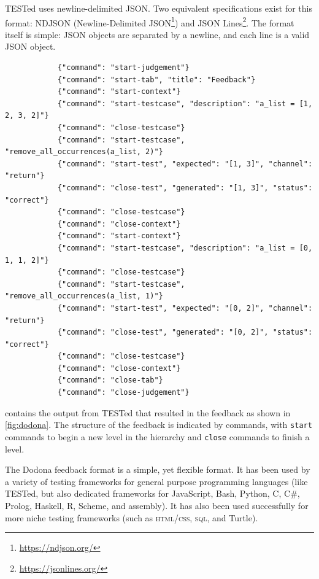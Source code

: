 \documentclass[../main]{subfiles}
\begin{document}
TESTed uses newline-delimited JSON\@.
Two equivalent specifications exist for this format: NDJSON (Newline-Delimited JSON\footnote{\url{https://ndjson.org/}}) and JSON Lines\footnote{\url{https://jsonlines.org/}}.
The format itself is simple: JSON objects are separated by a newline, and each line is a valid JSON object.

\begin{listing}
    \begin{wide}
        \begin{verbatim}
            {"command": "start-judgement"}
            {"command": "start-tab", "title": "Feedback"}
            {"command": "start-context"}
            {"command": "start-testcase", "description": "a_list = [1, 2, 3, 2]"}
            {"command": "close-testcase"}
            {"command": "start-testcase", "remove_all_occurrences(a_list, 2)"}
            {"command": "start-test", "expected": "[1, 3]", "channel": "return"}
            {"command": "close-test", "generated": "[1, 3]", "status": "correct"}
            {"command": "close-testcase"}
            {"command": "close-context"}
            {"command": "start-context"}
            {"command": "start-testcase", "description": "a_list = [0, 1, 1, 2]"}
            {"command": "close-testcase"}
            {"command": "start-testcase", "remove_all_occurrences(a_list, 1)"}
            {"command": "start-test", "expected": "[0, 2]", "channel": "return"}
            {"command": "close-test", "generated": "[0, 2]", "status": "correct"}
            {"command": "close-testcase"}
            {"command": "close-context"}
            {"command": "close-tab"}
            {"command": "close-judgement"}
        \end{verbatim}
    \end{wide}
    \caption{
        Example of the output generated by TESTed, which is rendered in \cref{fig:dodona}.
        As before, each context consists of two test cases, the first of which has no explicit tests, while the second has one test (the expected return value).
    }
    \label{lst:tested-output-example}
\end{listing}

 contains the output from TESTed that resulted in the feedback as shown in \cref{fig:dodona}.
The structure of the feedback is indicated by commands, with \texttt{start} commands to begin a new level in the hierarchy and \texttt{close} commands to finish a level.

The Dodona feedback format is a simple, yet flexible format.
It has been used by a variety of testing frameworks for general purpose programming languages (like TESTed, but also dedicated frameworks for JavaScript, Bash, Python, C, C\#, Prolog, Haskell, R, Scheme, and assembly).
It has also been used successfully for more niche testing frameworks (such as \textsc{html}/\textsc{css}, \textsc{sql}, and Turtle).
\end{document}
